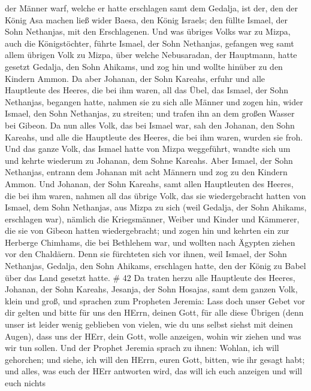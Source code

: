 der Männer warf, welche er hatte erschlagen samt dem Gedalja, ist der,
den der König Asa machen ließ wider Baesa, den König Israels; den füllte
Ismael, der Sohn Nethanjas, mit den Erschlagenen.  Und was
übriges Volks war zu Mizpa, auch die Königstöchter, führte Ismael, der
Sohn Nethanjas, gefangen weg samt allem übrigen Volk zu Mizpa, über
welche Nebusaradan, der Hauptmann, hatte gesetzt Gedalja, den Sohn
Ahikams, und zog hin und wollte hinüber zu den Kindern Ammon.
 Da aber Johanan, der Sohn Kareahs, erfuhr und alle
Hauptleute des Heeres, die bei ihm waren, all das Übel, das Ismael, der
Sohn Nethanjas, begangen hatte,  nahmen sie zu sich alle
Männer und zogen hin, wider Ismael, den Sohn Nethanjas, zu streiten; und
trafen ihn an dem großen Wasser bei Gibeon.  Da nun alles
Volk, das bei Ismael war, sah den Johanan, den Sohn Kareahs, und alle
die Hauptleute des Heeres, die bei ihm waren, wurden sie froh.
 Und das ganze Volk, das Ismael hatte von Mizpa weggeführt,
wandte sich um und kehrte wiederum zu Johanan, dem Sohne Kareahs.
 Aber Ismael, der Sohn Nethanjas, entrann dem Johanan mit
acht Männern und zog zu den Kindern Ammon.  Und Johanan,
der Sohn Kareahs, samt allen Hauptleuten des Heeres, die bei ihm waren,
nahmen all das übrige Volk, das sie wiedergebracht hatten von Ismael,
dem Sohn Nethanjas, aus Mizpa zu sich (weil Gedalja, der Sohn Ahikams,
erschlagen war), nämlich die Kriegsmänner, Weiber und Kinder und
Kämmerer, die sie von Gibeon hatten wiedergebracht;  und
zogen hin und kehrten ein zur Herberge Chimhams, die bei Bethlehem war,
und wollten nach Ägypten ziehen vor den Chaldäern.  Denn
sie fürchteten sich vor ihnen, weil Ismael, der Sohn Nethanjas, Gedalja,
den Sohn Ahikams, erschlagen hatte, den der König zu Babel über das Land
gesetzt hatte. \# 42  Da traten herzu alle Hauptleute des
Heeres, Johanan, der Sohn Kareahs, Jesanja, der Sohn Hosajas, samt dem
ganzen Volk, klein und groß,  und sprachen zum Propheten
Jeremia: Lass doch unser Gebet vor dir gelten und bitte für uns den
HErrn, deinen Gott, für alle diese Übrigen (denn unser ist leider wenig
geblieben von vielen, wie du uns selbst siehst mit deinen Augen),
 dass uns der HErr, dein Gott, wolle anzeigen, wohin wir
ziehen und was wir tun sollen.  Und der Prophet Jeremia
sprach zu ihnen: Wohlan, ich will gehorchen; und siehe, ich will den
HErrn, euren Gott, bitten, wie ihr gesagt habt; und alles, was euch der
HErr antworten wird, das will ich euch anzeigen und will euch nichts
